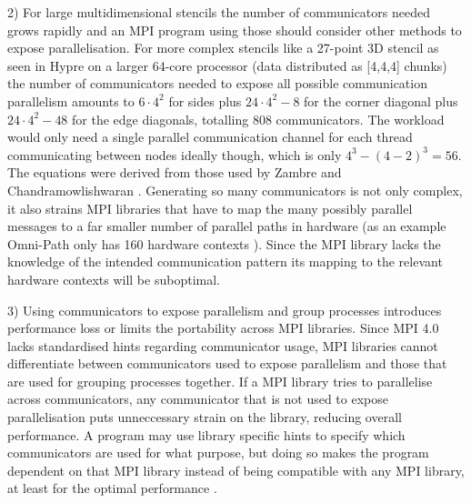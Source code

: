\documentclass[sigconf]{acmart}
\begin{document}
2) For large multidimensional stencils the number of communicators needed grows rapidly and an MPI program using those should consider other methods to expose parallelisation.
For more complex stencils like a 27-point 3D stencil as seen in Hypre\cite{hypre2020} on a larger 64-core processor (data distributed as [4,4,4] chunks) the number of communicators needed to expose all possible communication parallelism amounts to $6 \cdot 4^2$ for sides plus $24 \cdot 4^2 - 8$ for the corner diagonal plus $24 \cdot 4^2 - 48$ for the edge diagonals, totalling $808$ communicators.
The workload would only need a single parallel communication channel for each thread communicating between nodes ideally though, which is only $4^3 - (4-2)^3 = 56$.
The equations were derived from those used by Zambre and Chandramowlishwaran \cite{zambreLessonsLearned2022}.
Generating so many communicators is not only complex, it also strains MPI libraries that have to map the many possibly parallel messages to a far smaller number of parallel paths in hardware (as an example Omni-Path only has 160 hardware contexts \cite{intelOmniPath}).
Since the MPI library lacks the knowledge of the intended communication pattern its mapping to the relevant hardware contexts will be suboptimal.

3) Using communicators to expose parallelism and group processes introduces performance loss or limits the portability across MPI libraries.
Since MPI 4.0 lacks standardised hints regarding communicator usage, MPI libraries cannot differentiate between communicators used to expose parallelism and those that are used for grouping processes together.
If a MPI library tries to parallelise across communicators, any communicator that is not used to expose parallelisation puts unneccessary strain on the library, reducing overall performance.
A program may use library specific hints to specify which communicators are used for what purpose, but doing so makes the program dependent on that MPI library instead of being compatible with any MPI library, at least for the optimal performance \cite{zambreLessonsLearned2022}.
\end{document}
